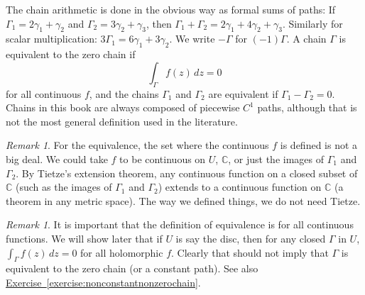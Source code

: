 \documentclass[12pt,openany]{book}
\newcommand{\C}{{\mathbb{C}}}
\theoremstyle{plain}
\theoremstyle{remark}
\newtheorem{remark}[thm]{Remark}
\theoremstyle{definition}
\theoremstyle{exercise}
\theoremstyle{example}
\newcommand{\exerciseref}[1]{\hyperref[#1]{Exercise~\ref*{#1}}}
\begin{document}
The chain arithmetic is done in the obvious way as formal sums of paths:
If $\Gamma_1 = 2 \gamma_1 + \gamma_2$ and $\Gamma_2 = 3 \gamma_2 +
\gamma_3$, then $\Gamma_1 + \Gamma_2 = 2 \gamma_1 + 4 \gamma_2 + \gamma_3$.
Similarly for scalar multiplication: $3 \Gamma_1 = 6 \gamma_1 + 3 \gamma_2$.
We write $-\Gamma$ for $(-1)\Gamma$.
A chain $\Gamma$ is equivalent to the zero chain if
\begin{equation*}
\int_\Gamma f(z)\, dz = 0
\end{equation*}
for all continuous $f$, and
the chains $\Gamma_1$ and $\Gamma_2$ are equivalent if $\Gamma_1 - \Gamma_2 = 0$.
Chains in this book are always composed of piecewise $C^1$ paths,
although that is not the most general definition used in the literature.

\begin{remark}
For the equivalence,
the set where the continuous $f$ is defined is not a big deal.  We could
take $f$ to be continuous on $U$, $\C$, or just the images of
$\Gamma_1$ and $\Gamma_2$.
By Tietze's extension theorem, any continuous function on a closed subset of
$\C$ (such as the images of $\Gamma_1$ and $\Gamma_2$) extends to a
continuous function on $\C$ (a theorem in any metric space).
The way we defined things, we do not need Tietze.
\end{remark}

\begin{remark}
It is important that the definition of equivalence is for all continuous
functions.  We will show later that if $U$ is say the disc, then for
any closed $\Gamma$ in $U$, $\int_\Gamma f(z) \, dz = 0$ for all holomorphic $f$.
Clearly that should not imply that $\Gamma$ is equivalent to the zero chain
(or a constant path).  See also \exerciseref{exercise:nonconstantnonzerochain}.
\end{remark}
\end{document}
